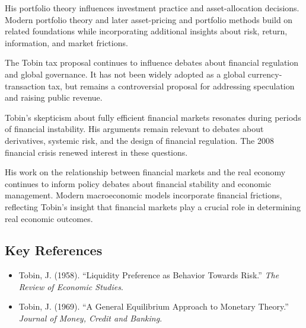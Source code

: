 His portfolio theory influences investment practice and asset-allocation
decisions. Modern portfolio theory and later asset-pricing and portfolio
methods build on related foundations while incorporating additional insights
about risk, return, information, and market frictions.

The Tobin tax proposal continues to influence debates about financial
regulation and global governance. It has not been widely adopted as a global
currency-transaction tax, but remains a controversial proposal for addressing
speculation and raising public revenue.

Tobin's skepticism about fully efficient financial markets resonates during
periods of financial instability. His arguments remain relevant to debates
about derivatives, systemic risk, and the design of financial regulation. The
2008 financial crisis renewed interest in these questions.

His work on the relationship between financial markets and the real economy
continues to inform policy debates about financial stability and economic
management. Modern macroeconomic models incorporate financial frictions,
reflecting Tobin's insight that financial markets play a crucial role in
determining real economic outcomes.

\subsection*{Key References}
\begin{itemize}
    \item Tobin, J. (1958). ``Liquidity Preference as Behavior Towards Risk.'' \textit{The Review of Economic Studies}.
    \item Tobin, J. (1969). ``A General Equilibrium Approach to Monetary Theory.'' \textit{Journal of Money, Credit and Banking}.
\end{itemize}

